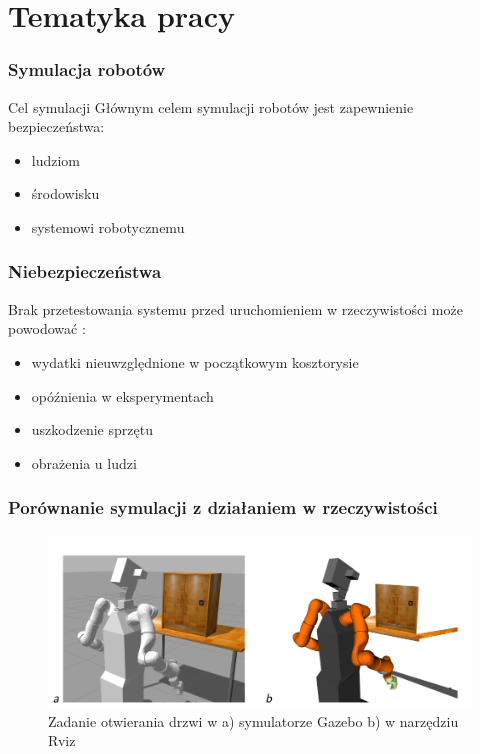 \section{Tematyka pracy}

\begin{frame}
\frametitle{Symulacja robotów}
\begin{block}{Cel symulacji}
	Głównym celem symulacji robotów jest zapewnienie bezpieczeństwa:
	\begin{itemize}
		\item ludziom
		\item środowisku
		\item systemowi robotycznemu
	\end{itemize}
\end{block}
\end{frame}


\begin{frame}
	\frametitle{Niebezpieczeństwa}
	Brak przetestowania systemu przed uruchomieniem w rzeczywistości może powodować \cite{bezpieczenstwo}:
	\begin{itemize}
		\item wydatki nieuwzględnione w początkowym kosztorysie
		\item opóźnienia w eksperymentach
		\item uszkodzenie sprzętu
		\item obrażenia u ludzi
	\end{itemize}
\end{frame}


\begin{frame}
\frametitle{Porównanie symulacji z działaniem w rzeczywistości}
\begin{figure}
	\includegraphics[scale=0.35]{./images/otwieranie_gz.png}
	\caption{Zadanie otwierania drzwi w a) symulatorze Gazebo b) w narzędziu Rviz}
	\end{figure}
\end{frame}


